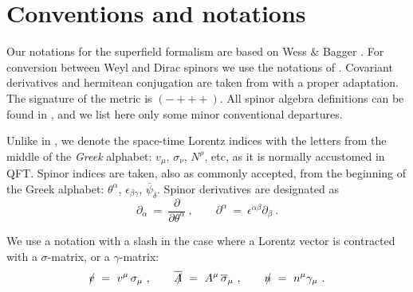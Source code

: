 \documentclass[12pt]{revtex4}
\newcommand{\slashed}[1]{\hbox{{$#1$}\llap{$/$}}}
\begin{document}
\section{Conventions and notations}
\label{app_conventions}

Our notations for the superfield formalism are based on 
Wess \& Bagger 
\cite{Wess:1992cp}.
For conversion between Weyl and Dirac spinors we use the notations
of 
\cite{Martin:1997ns}.
Covariant derivatives and hermitean conjugation are taken from
\cite{Gates:1983nr}
with a proper adaptation. The signature of the metric is 
$ (-+++) $.
All spinor algebra definitions can be found in 
\cite{Wess:1992cp},
and we list here only some minor conventional departures.

Unlike in \cite{Wess:1992cp}, we denote the space-time Lorentz
indices with the letters from the middle of the \emph{Greek}
alphabet:
$ v_\mu $, $ \sigma_\nu $, $ N^\rho $, etc,
as it is normally accustomed in QFT.
Spinor indices are taken, also as commonly accepted, from the
beginning of the Greek alphabet:
$ \theta^\alpha $, $ \epsilon_{\beta\gamma} $, 
$ \overline{\psi}_{\dot\delta}$.
Spinor derivatives are designated as
\[ 
\partial_\alpha ~=~ \frac{\partial}{\partial\theta^\alpha}~,
\qquad
\partial^\alpha ~=~ \epsilon^{\alpha\beta}\partial_\beta~.
\]

We use a notation with a slash in the case where a Lorentz
vector is contracted with a $ \sigma $-matrix, or a $ \gamma $-matrix:
%
\begin{equation}
\label{def_slashed}
\slashed{v} ~=~ v^\mu\, \sigma_\mu~, 
\qquad
\overline{\slashed{A}} ~=~ A^\mu\, \overline{\sigma}_\mu~, 
\qquad
\slashed{n} ~=~ n^\mu \gamma_\mu~.
\end{equation}
%
\end{document}

